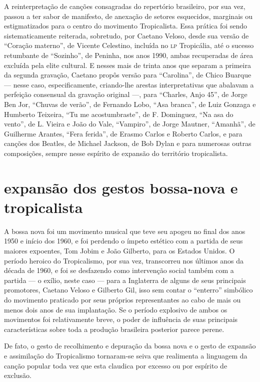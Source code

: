 A reinterpretação de canções consagradas do repertório brasileiro, por
sua vez, passou a ter sabor de manifesto, de anexação de setores
esquecidos, marginais ou estigmatizados para o centro do movimento
Tropicalista. Essa prática foi sendo sistematicamente reiterada,
sobretudo, por Caetano Veloso, desde sua versão de ``Coração materno'', de Vicente Celestino, incluída no \textsc{lp} Tropicália, até o sucesso retumbante
de ``Sozinho'', de Peninha, nos anos 1990, ambas recuperadas de área
excluída pela elite cultural. E nesses mais de trinta anos que separam a
primeira da segunda gravação, Caetano propôs versão para ``Carolina'', de Chico Buarque --- nesse caso, especificamente, criando-lhe arestas
interpretativas que abalavam a perfeição consensual da gravação original
---, para ``Charles, Anjo 45'', de Jorge Ben Jor, ``Chuvas de verão'', de Fernando Lobo, ``Asa branca'', de Luiz Gonzaga e Humberto Teixeira, ``Tu
me acostumbraste'', de  F. Dominguez, ``Na asa do vento'', de L. Vieira e João
do Vale, ``Vampiro'', de Jorge Mautner, ``Amanhã'', de Guilherme Arantes,
``Fera ferida'', de Erasmo Carlos e Roberto Carlos, e para canções dos
Beatles, de Michael Jackson, de Bob Dylan e para numerosas outras
composições, sempre nesse espírito de expansão do território
tropicalista.

\section{expansão dos gestos bossa-nova e tropicalista}

A bossa nova foi um movimento musical que teve seu apogeu no final dos
anos 1950 e início dos 1960, e foi perdendo o ímpeto estético com a
partida de seus maiores expoentes, Tom Jobim e João Gilberto, para os
Estados Unidos. O período heroico do Tropicalismo, por sua vez,
transcorreu nos últimos anos da década de 1960, e foi se desfazendo como
intervenção social também com a partida --- o exílio, neste caso --- para a
Inglaterra de alguns de seus principais promotores, Caetano Veloso e
Gilberto Gil, isso sem contar o ``enterro'' simbólico do movimento
praticado por seus próprios representantes ao cabo de mais ou menos dois
anos de sua implantação. Se o período explosivo de ambos os movimentos
foi relativamente breve, o poder de influência de suas principais
características sobre toda a produção brasileira posterior parece
perene.

De fato, o gesto de recolhimento e depuração da bossa nova e o gesto de
expansão e assimilação do Tropicalismo tornaram-se seiva que realimenta
a linguagem da canção popular toda vez que esta claudica por excesso ou
por espírito de exclusão.

